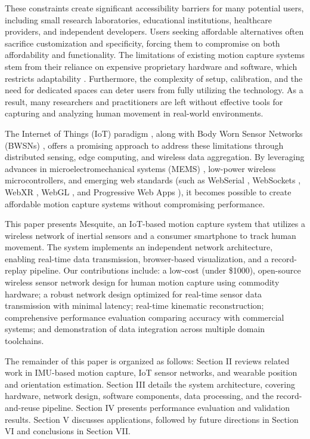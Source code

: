 \documentclass[lettersize,journal]{IEEEtran}
\begin{document}
These constraints create significant accessibility barriers for many potential users, including small research laboratories, educational institutions, healthcare providers, and independent developers. Users seeking affordable alternatives often sacrifice customization and specificity, forcing them to compromise on both affordability and functionality. The limitations of existing motion capture systems stem from their reliance on expensive proprietary hardware and software, which restricts adaptability \cite{cheung2016}. Furthermore, the complexity of setup, calibration, and the need for dedicated spaces can deter users from fully utilizing the technology. As a result, many researchers and practitioners are left without effective tools for capturing and analyzing human movement in real-world environments.

The Internet of Things (IoT) paradigm \cite{atzori2010}, along with Body Worn Sensor Networks (BWSNs) \cite{pantelopoulos2010survey}, offers a promising approach to address these limitations through distributed sensing, edge computing, and wireless data aggregation. By leveraging advances in microelectromechanical systems (MEMS) \cite{foxlin2005}, low-power wireless microcontrollers, and emerging web standards (such as WebSerial \cite{webserial}, WebSockets \cite{websockets}, WebXR \cite{webxr}, WebGL \cite{webgl}, and Progressive Web Apps \cite{pwa}), it becomes possible to create affordable motion capture systems without compromising performance.

This paper presents Mesquite, an IoT-based motion capture system that utilizes a wireless network of inertial sensors and a consumer smartphone to track human movement. The system implements an independent network architecture, enabling real-time data transmission, browser-based visualization, and a record-replay pipeline. Our contributions include: a low-cost (under \$1000), open-source wireless sensor network design for human motion capture using commodity hardware; a robust network design optimized for real-time sensor data transmission with minimal latency; real-time kinematic reconstruction; comprehensive performance evaluation comparing accuracy with commercial systems; and demonstration of data integration across multiple domain toolchains.

The remainder of this paper is organized as follows: Section II reviews related work in IMU-based motion capture, IoT sensor networks, and wearable position and orientation estimation. Section III details the system architecture, covering hardware, network design, software components, data processing, and the record-and-reuse pipeline. Section IV presents performance evaluation and validation results. Section V discusses applications, followed by future directions in Section VI and conclusions in Section VII.
\end{document}
